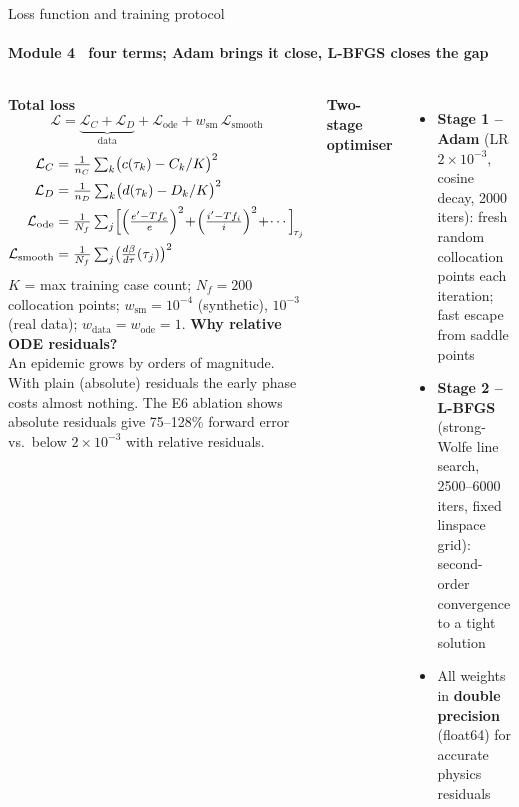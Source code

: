 \begin{frame}{Loss function and training protocol}
\framesubtitle{Module 4 \textbullet\ four terms; Adam brings it close, L-BFGS closes the gap}
\vspace{-2pt}
\begin{columns}[T,onlytextwidth]
  \footnotesize\raggedright
  \textbf{\color{mvPINN}Total loss}
  \[
    \mathcal{L} = \underbrace{\mathcal{L}_C + \mathcal{L}_D}_{\text{data}} + \mathcal{L}_{\text{ode}} + w_{\text{sm}}\,\mathcal{L}_{\text{smooth}}
  \]
  \vspace{-6pt}
  \begin{align*}
    \mathcal{L}_C &= \tfrac{1}{n_C}\textstyle\sum_k\bigl(c(\tau_k)-C_k/K\bigr)^2 \\
    \mathcal{L}_D &= \tfrac{1}{n_D}\textstyle\sum_k\bigl(d(\tau_k)-D_k/K\bigr)^2 \\
    \mathcal{L}_{\text{ode}} &= \tfrac{1}{N_f}\textstyle\sum_j\Bigl[
      \Bigl(\tfrac{e'-Tf_e}{e}\Bigr)^2\!+\!\Bigl(\tfrac{i'-Tf_i}{i}\Bigr)^2
      \!+\!\cdots\Bigr]_{\!\tau_j} \\
    \mathcal{L}_{\text{smooth}} &= \tfrac{1}{N_f}\textstyle\sum_j\bigl(\tfrac{d\beta}{d\tau}(\tau_j)\bigr)^2
  \end{align*}
  {\scriptsize $K$ = max training case count; $N_f=200$ collocation points; $w_{\text{sm}}=10^{-4}$ (synthetic), $10^{-3}$ (real data); $w_{\text{data}}=w_{\text{ode}}=1$.}
  \vspace{3pt}
  \textbf{\color{mvPINN}Why relative ODE residuals?}\\
  {\small An epidemic grows by orders of magnitude. With plain (absolute) residuals the early phase costs almost nothing. The E6 ablation shows absolute residuals give 75--128\% forward error vs.\ below $2\times10^{-3}$ with relative residuals.}
  \footnotesize\raggedright
  \textbf{\color{mvPINN}Two-stage optimiser}
  \begin{itemize}\setlength{\itemsep}{1pt}
    \item \textbf{Stage 1 -- Adam} (LR $2\times10^{-3}$, cosine decay, 2000 iters): fresh random collocation points each iteration; fast escape from saddle points
    \item \textbf{Stage 2 -- L-BFGS} (strong-Wolfe line search, 2500--6000 iters, fixed linspace grid): second-order convergence to a tight solution
    \item All weights in \textbf{double precision} (float64) for accurate physics residuals

\end{itemize}
\end{columns}
\end{frame}
